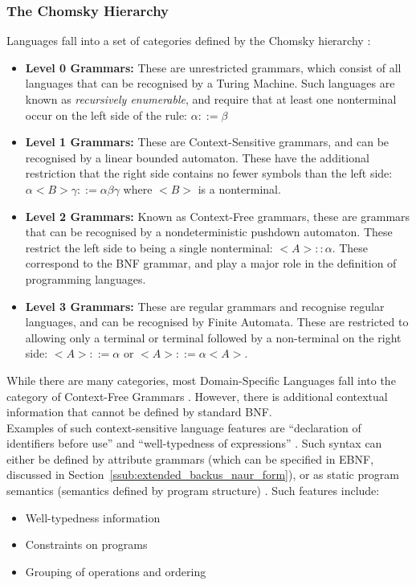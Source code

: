 \documentclass[a4paper,11pt]{report}
\begin{document}
\subsubsection{The Chomsky Hierarchy} %
\label{ssub:the_chomsky_hierarchy}
Languages fall into a set of categories defined by the Chomsky hierarchy \citep{slonneger1995formal}:
\begin{itemize}
    \item \textbf{Level 0 Grammars:} These are unrestricted grammars, which consist of all languages that can be recognised by a Turing Machine.
    Such languages are known as \textit{recursively enumerable}, and require that at least one nonterminal occur on the left side of the rule: $\alpha ::= \beta$
    \item \textbf{Level 1 Grammars:} These are Context-Sensitive grammars, and can be recognised by a linear bounded automaton. 
    These have the additional restriction that the right side contains no fewer symbols than the left side: $\alpha<B>\gamma ::= \alpha\beta\gamma$ where $<B>$ is a nonterminal.
    \item \textbf{Level 2 Grammars:} Known as Context-Free grammars, these are grammars that can be recognised by a nondeterministic pushdown automaton.
    These restrict the left side to being a single nonterminal: $<A> :: \alpha$.
    These correspond to the BNF grammar, and play a major role in the definition of programming languages. 
    \item \textbf{Level 3 Grammars:} These are regular grammars and recognise regular languages, and can be recognised by Finite Automata. 
    These are restricted to allowing only a terminal or terminal followed by a non-terminal on the right side: $<A> ::= \alpha$ or $<A> ::= \alpha<A>$.
\end{itemize}

While there are many categories, most Domain-Specific Languages fall into the category of Context-Free Grammars \citep{Siek:2010:GPL:1706356.1706358}.
However, there is additional contextual information that cannot be defined by standard BNF.\\

Examples of such context-sensitive language features are ``declaration of identifiers before use'' and ``well-typedness of expressions'' \citep{mosses1992action}.
Such syntax can either be defined by attribute grammars (which can be specified in EBNF, discussed in Section~\ref{ssub:extended_backus_naur_form}), or as static program semantics (semantics defined by program structure) \citep{mosses1992action}. 
Such features include:
\begin{itemize}
    \item Well-typedness information
    \item Constraints on programs
    \item Grouping of operations and ordering
\end{itemize}
\end{document}

